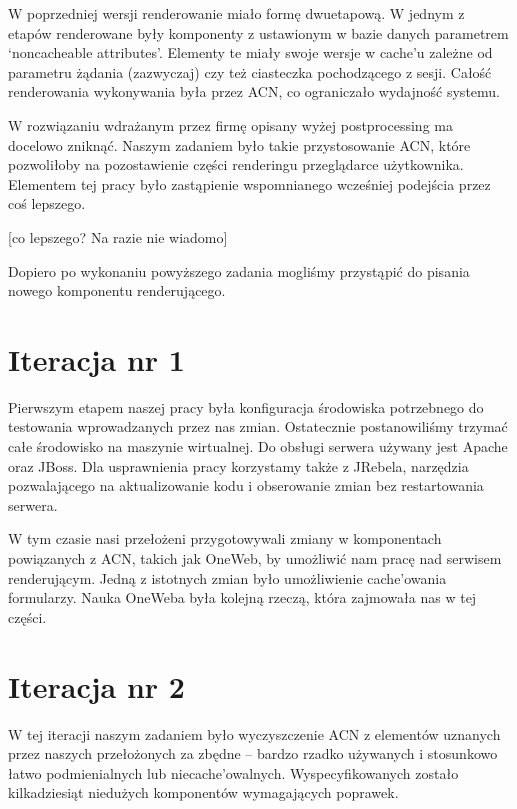 \documentclass[licencjacka]{pracamgr}
\begin{document}
W poprzedniej wersji renderowanie miało formę dwuetapową. W jednym z etapów renderowane były komponenty z ustawionym w bazie danych parametrem ‘noncacheable attributes’. Elementy te miały swoje wersje w cache’u zależne od parametru żądania (zazwyczaj) czy też ciasteczka pochodzącego z sesji. Całość renderowania wykonywania była przez ACN, co ograniczało wydajność systemu.

\vspace{1mm}

W rozwiązaniu wdrażanym przez firmę opisany wyżej postprocessing ma docelowo zniknąć. Naszym zadaniem było takie przystosowanie ACN, które pozwoliłoby na pozostawienie części renderingu przeglądarce użytkownika. Elementem tej pracy było zastąpienie wspomnianego wcześniej podejścia przez coś lepszego.

	[co lepszego? Na razie nie wiadomo]
	
\vspace{1mm}	
	
Dopiero po wykonaniu powyższego zadania mogliśmy przystąpić do pisania nowego komponentu renderującego.

\section{Iteracja nr 1}
	
Pierwszym etapem naszej pracy była konfiguracja środowiska potrzebnego do testowania wprowadzanych przez nas zmian. Ostatecznie postanowiliśmy trzymać całe środowisko na maszynie wirtualnej. Do obsługi serwera używany jest Apache oraz JBoss. Dla usprawnienia pracy korzystamy także z JRebela, narzędzia pozwalającego na aktualizowanie kodu i obserowanie zmian bez restartowania serwera.

\vspace{1mm}

W tym czasie nasi przełożeni przygotowywali zmiany w komponentach powiązanych z ACN, takich jak OneWeb, by umożliwić nam pracę nad serwisem renderującym. Jedną z istotnych zmian było umożliwienie cache’owania formularzy. Nauka OneWeba była kolejną rzeczą, która zajmowała nas w tej części.
	
\section{Iteracja nr 2}

W tej iteracji naszym zadaniem było wyczyszczenie ACN z elementów uznanych przez naszych przełożonych za zbędne – bardzo rzadko używanych i stosunkowo łatwo podmienialnych lub niecache’owalnych. Wyspecyfikowanych zostało kilkadziesiąt niedużych komponentów wymagających poprawek.
\end{document}
